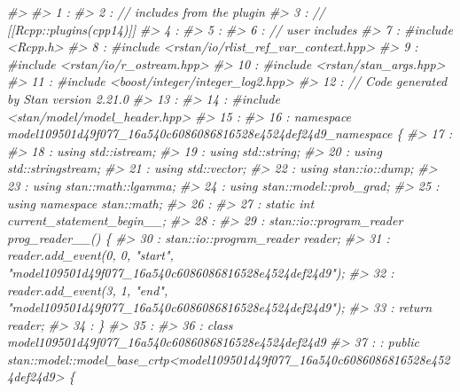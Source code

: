 \documentclass[
  10pt,
  italian,
  a4paper,
  extrafontsizes,onecolumn,openright
  ]{memoir}
\newenvironment{Shaded}{\begin{snugshade}}{\end{snugshade}}
\newcommand{\CommentTok}[1]{\textcolor[rgb]{0.56,0.35,0.01}{\textit{#1}}}
\begin{document}
\begin{Shaded}
\begin{Highlighting}[]
\CommentTok{\#\textgreater{} }
\CommentTok{\#\textgreater{}    1 : }
\CommentTok{\#\textgreater{}    2 : // includes from the plugin}
\CommentTok{\#\textgreater{}    3 : // [[Rcpp::plugins(cpp14)]]}
\CommentTok{\#\textgreater{}    4 : }
\CommentTok{\#\textgreater{}    5 : }
\CommentTok{\#\textgreater{}    6 : // user includes}
\CommentTok{\#\textgreater{}    7 : \#include \textless{}Rcpp.h\textgreater{}}
\CommentTok{\#\textgreater{}    8 : \#include \textless{}rstan/io/rlist\_ref\_var\_context.hpp\textgreater{}}
\CommentTok{\#\textgreater{}    9 : \#include \textless{}rstan/io/r\_ostream.hpp\textgreater{}}
\CommentTok{\#\textgreater{}   10 : \#include \textless{}rstan/stan\_args.hpp\textgreater{}}
\CommentTok{\#\textgreater{}   11 : \#include \textless{}boost/integer/integer\_log2.hpp\textgreater{}}
\CommentTok{\#\textgreater{}   12 : // Code generated by Stan version 2.21.0}
\CommentTok{\#\textgreater{}   13 : }
\CommentTok{\#\textgreater{}   14 : \#include \textless{}stan/model/model\_header.hpp\textgreater{}}
\CommentTok{\#\textgreater{}   15 : }
\CommentTok{\#\textgreater{}   16 : namespace model109501d49f077\_16a540c6086086816528e4524def24d9\_namespace \{}
\CommentTok{\#\textgreater{}   17 : }
\CommentTok{\#\textgreater{}   18 : using std::istream;}
\CommentTok{\#\textgreater{}   19 : using std::string;}
\CommentTok{\#\textgreater{}   20 : using std::stringstream;}
\CommentTok{\#\textgreater{}   21 : using std::vector;}
\CommentTok{\#\textgreater{}   22 : using stan::io::dump;}
\CommentTok{\#\textgreater{}   23 : using stan::math::lgamma;}
\CommentTok{\#\textgreater{}   24 : using stan::model::prob\_grad;}
\CommentTok{\#\textgreater{}   25 : using namespace stan::math;}
\CommentTok{\#\textgreater{}   26 : }
\CommentTok{\#\textgreater{}   27 : static int current\_statement\_begin\_\_;}
\CommentTok{\#\textgreater{}   28 : }
\CommentTok{\#\textgreater{}   29 : stan::io::program\_reader prog\_reader\_\_() \{}
\CommentTok{\#\textgreater{}   30 :     stan::io::program\_reader reader;}
\CommentTok{\#\textgreater{}   31 :     reader.add\_event(0, 0, "start", "model109501d49f077\_16a540c6086086816528e4524def24d9");}
\CommentTok{\#\textgreater{}   32 :     reader.add\_event(3, 1, "end", "model109501d49f077\_16a540c6086086816528e4524def24d9");}
\CommentTok{\#\textgreater{}   33 :     return reader;}
\CommentTok{\#\textgreater{}   34 : \}}
\CommentTok{\#\textgreater{}   35 : }
\CommentTok{\#\textgreater{}   36 : class model109501d49f077\_16a540c6086086816528e4524def24d9}
\CommentTok{\#\textgreater{}   37 :   : public stan::model::model\_base\_crtp\textless{}model109501d49f077\_16a540c6086086816528e4524def24d9\textgreater{} \{}

\end{Highlighting}
\end{Shaded}
\end{document}
